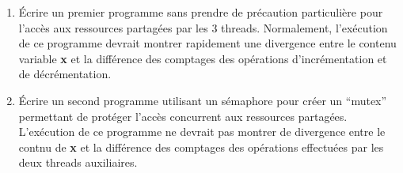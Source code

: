 \documentclass[CC,sansRappel,12pt]{tdtp-utf8}
\begin{document}
\begin{feuille}
\begin{exercice}
\begin{enumerate}
\item Écrire un premier programme sans prendre de précaution particulière
pour l'accès aux ressources partagées par les 3 threads. Normalement,
l'exécution de ce programme devrait montrer rapidement une divergence entre
le contenu variable \textbf{x} et la différence des comptages des opérations
d'incrémentation et de décrémentation.
\item Écrire un second programme utilisant un sémaphore pour créer un
``mutex'' permettant de
protéger l'accès concurrent aux ressources partagées. L'exécution de
ce programme ne devrait pas montrer de divergence entre le contnu
de \textbf{x} et
la différence des comptages des opérations effectuées par les deux threads
auxiliaires.
\end{enumerate}

\end{exercice}

\end{feuille}
\end{document}
